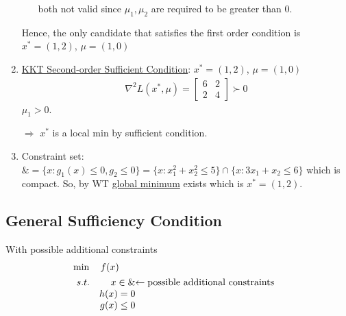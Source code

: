 \documentclass[11pt,a4paper]{article}
\begin{document}
\begin{enumerate}[$\bullet$]
\begin{enumerate}[(1)]
\begin{equation}
        \end{equation}
        both not valid since $\mu_1,\mu_2$ are required to be greater than $0$.
    \end{enumerate}
    Hence, the only candidate that satisfies the first order condition is $x^*=(1,2)$, $\mu=(1,0)$
    \item \underline{KKT Second-order Sufficient Condition}:
    $x^*=(1,2)$, $\mu=(1,0)$
    \begin{equation}
        \begin{aligned}
            \nabla^2 L(x^*,\mu)=\begin{bmatrix}
                6&	2\\
                2&	4
            \end{bmatrix}\succ 0
        \end{aligned}
        \nonumber
    \end{equation}
    $\mu_1>0$.

    $\Rightarrow$ $x^*$ is a local min by sufficient condition.
    \item Constraint set: $\&=\{x:g_1(x)\leq 0,g_2\leq 0\}=\{x:x_1^2+x_2^2\leq 5\}\cap \{x:3x_1+x_2\leq 6\}$ which is compact. So, by WT \underline{global minimum} exists which is $x^*=(1,2)$.
\end{enumerate}

\subsection{General Sufficiency Condition}
With possible additional constraints
\begin{align*}
    &\min\quad f(x)\\
    &\begin{array}{r@{\quad}r@{}l@{\quad}l}
    s.t.
    &x\in\&&\leftarrow \text{possible additional constraints}\\
    &h(x)=0&\\
    &g(x)\leq 0&\\
\end{array}
\end{align*}
\end{document}
